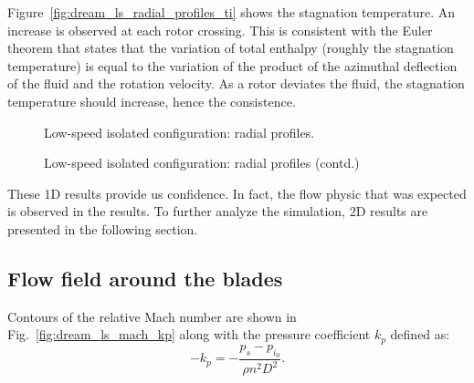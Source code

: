Figure~\ref{fig:dream_ls_radial_profiles_ti}
shows the stagnation temperature.
An increase is observed at each 
rotor crossing. This is consistent with the
Euler theorem that states that the variation of total enthalpy (roughly
the stagnation temperature) is equal to the variation of the product of
the azimuthal deflection of the fluid and the rotation velocity. As a rotor
deviates the fluid, the stagnation temperature should increase, 
hence the consistence.
\begin{figure}[htb]
  \centering
  \caption{Low-speed isolated configuration: radial profiles.}
\end{figure}
\begin{figure}[htb]
  \centering
  \setcounter{subfigure}{3}
  \caption{Low-speed isolated configuration: radial profiles (contd.)}
  \label{fig:dream_ls_radial_profiles}
\end{figure}

These 1D results provide us confidence. In fact, the flow physic that
was expected is observed in the results. To further analyze the simulation,
2D results are presented in the following section.

\subsection{Flow field around the blades}
\label{sub:dream_ls_flow_field}

Contours of the relative Mach number are shown in 
Fig.~\ref{fig:dream_ls_mach_kp} along with the pressure coefficient
$k_p$ defined as:
\begin{equation}
   -k_p = - \frac{p_s - p_{i_0}}{\rho n^2 D^2}.
\end{equation}

